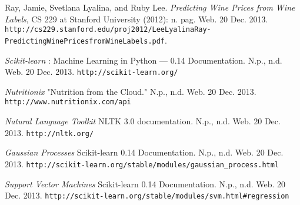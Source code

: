 \documentclass{article}
\begin{document}
\begin{thebibliography}{10}

Ray, Jamie, Svetlana Lyalina, and Ruby Lee.
\emph{Predicting Wine Prices from Wine Labels}, CS 229 at Stanford University (2012): n. pag. Web. 20 Dec. 2013.
\texttt{http://cs229.stanford.edu/proj2012/LeeLyalinaRay-PredictingWinePricesfromWineLabels.pdf}.

\emph{Scikit-learn} : Machine Learning in Python — 0.14 Documentation. N.p., n.d. Web. 20 Dec. 2013.
\texttt{http://scikit-learn.org/}

 \emph{Nutritionix} "Nutrition from the Cloud." N.p., n.d. Web. 20 Dec. 2013. \texttt{http://www.nutritionix.com/api}

 \emph{Natural Language Toolkit} NLTK 3.0 documentation. N.p., n.d. Web. 20 Dec. 2013. \texttt{http://nltk.org/}

 \emph{Gaussian Processes} Scikit-learn 0.14 Documentation. N.p., n.d. Web. 20 Dec. 2013. \texttt{http://scikit-learn.org/stable/modules/gaussian\_process.html}

 \emph{Support Vector Machines} Scikit-learn 0.14 Documentation. N.p., n.d. Web. 20 Dec. 2013. \texttt{http://scikit-learn.org/stable/modules/svm.html\#regression}

\end{thebibliography}
\end{document}
